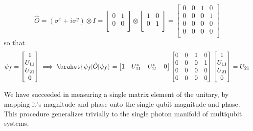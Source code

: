 \begin{equation}
    \hat{O}=(\sigma^{x} + i\sigma^{y}) \otimes I=
    \begin{bmatrix}
        0 & 1\\
        0 & 0\\
    \end{bmatrix}
    \otimes
    \begin{bmatrix}
        1 & 0\\
        0 & 1\\
    \end{bmatrix}
    =
    \begin{bmatrix}
        0 & 0 & 1 & 0\\
        0 & 0 & 0 & 1\\
        0 & 0 & 0 & 0\\
        0 & 0 & 0 & 0\\
    \end{bmatrix}
\end{equation}
so that
\begin{equation}
    \psi_{f}=
    \begin{bmatrix}
        1 \\
        U_{11} \\
        U_{21} \\
        0 \\
    \end{bmatrix}
    \implies
    \braket{\psi_{f}|\hat{O}|\psi_{f}} =
    \begin{bmatrix}
        1 & U_{11}^{*} & U_{21}^{*} & 0
    \end{bmatrix}
    \begin{bmatrix}
        0 & 0 & 1 & 0\\
        0 & 0 & 0 & 1\\
        0 & 0 & 0 & 0\\
        0 & 0 & 0 & 0\\
    \end{bmatrix}
    \begin{bmatrix}
        1 \\
        U_{11} \\
        U_{21} \\
        0 \\
    \end{bmatrix}
    = U_{21}
\end{equation}

We have succeeded in measuring a single matrix element of the unitary, by mapping it's magnitude and phase onto the single qubit magnitude and phase.
This procedure generalizes trivially to the single photon manifold of multiqubit systems.
